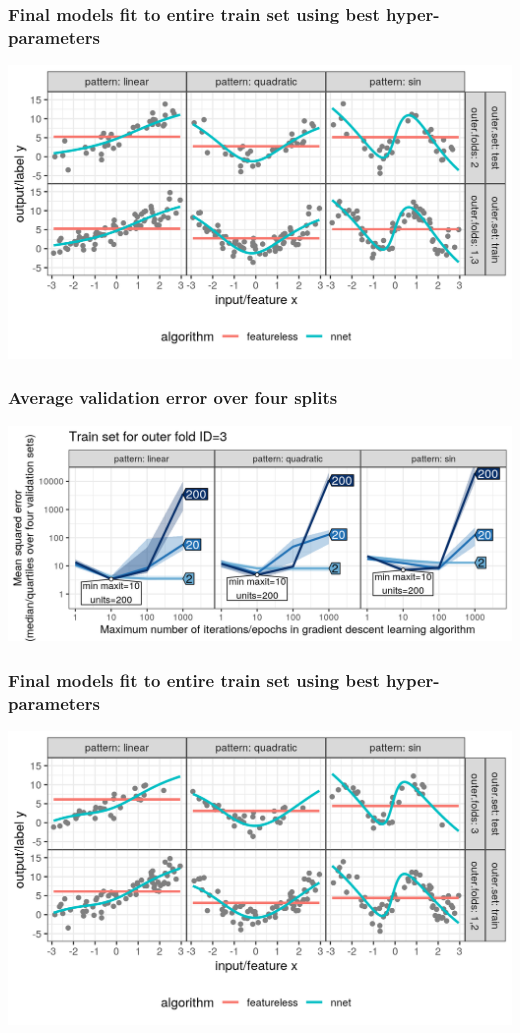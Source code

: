 \documentclass{beamer}
\begin{document}
\begin{frame}
  \frametitle{Final models fit to entire train set using best hyper-parameters}

  \includegraphics[width=\textwidth]{figure-overfitting-cv-data-test-fold-2-pred.png}
\end{frame}

\begin{frame}
  \frametitle{Average validation error over four splits}

  \includegraphics[width=\textwidth]{figure-overfitting-cv-data-median-mse-3.png}
\end{frame}

\begin{frame}
  \frametitle{Final models fit to entire train set using best hyper-parameters}

  \includegraphics[width=\textwidth]{figure-overfitting-cv-data-test-fold-3-pred.png}
\end{frame}
\end{document}
